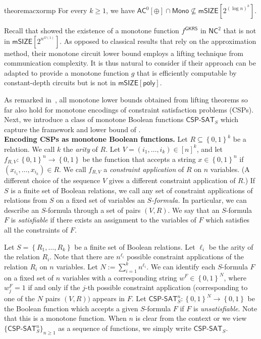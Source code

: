\documentclass[10pt,a4paper]{article}
\newcommand{\poly}{\mathsf{poly}}
\newcommand{\complexityfont}[1]{\mathsf{#1}}
\newcommand{\monclass}[1]{\mathsf{m}#1}
\def\AC           {\complexityfont{AC}}
\def\NC           {\complexityfont{NC}}
\def\SIZE         {\complexityfont{SIZE}}
\def\mSIZE        {\monclass{\SIZE}}
\newcommand{\semMon}[1]{#1 \cap \monfns}
\newcommand{\monfns}{\mathsf{Mono}}
\def\sseq{\subseteq}
\newcommand{\set}[1]{\left\{#1\right\}}
\newcommand{\blt}{\set{0,1}}
\newcommand{\CSPf}[1]{\mathsf{CSP}\text{-}\mathsf{SAT}_{#1}}
\newcommand{\CSPfn}[2]{\CSPf{#1}^{#2}}
\begin{document}
\begin{restatable}{theorem}{acxormp}
    \label{thm:ac02-mp-intro}
    For every $k \geq 1$,
    we have
$\semMon{\AC^0[\oplus]} \not\sseq \mSIZE[2^{(\log n)^k}]$.
\end{restatable}

\label{sec:intro_mon_csp}

Recall that 
\citep{gkrs19} 
showed the existence of a monotone function $f^{\mathsf{GKRS}}$ in $\NC^2$ that is not in $\mSIZE[2^{n^{\Omega(1)}}]$. As opposed to classical results \citep{razborov1985lower, andreev1985method, DBLP:journals/combinatorica/AlonB87, tardos_1988} that rely on the approximation method, their monotone circuit lower bound employs a  lifting technique from communication complexity. It is thus natural to consider if their approach can be adapted to provide a monotone function $g$ that is efficiently computable by constant-depth circuits but is not in $\mSIZE[\poly]$. 

As remarked in~\cite{gkrs19,DBLP:journals/sigact/RezendeGR22}, all
monotone lower bounds 
obtained from lifting theorems so far 
also hold for monotone encodings of constraint satisfaction problems (CSPs). 
Next, we introduce a class of monotone Boolean functions $\CSPf{S}$ which
capture the framework and lower bound of \citep{gkrs19}.\\

\noindent \textbf{Encoding CSPs as monotone Boolean functions.} Let $R \sseq \blt^k$ be a relation.
We call $k$ the \emph{arity} of $R$.
Let
$V = (i_1,\dots,i_k) \in [n]^k$,
and 
let
$f_{R,V}: \blt^n \to \blt$
be
the function 
that
accepts a string $x \in \blt^n$
if $(x_{i_1},\dots,x_{i_k}) \in R$.
We call $f_{R,V}$ a \emph{constraint application} of $R$ on $n$ variables.
(A different choice of the sequence $V$
gives a different constraint application of $R$.)
If $S$ is a finite set of Boolean relations,
we call any set of constraint applications of relations from $S$
on a fixed set of variables
an \emph{$S$-formula.}
In particular, we can describe an $S$-formula through a set of pairs $(V,R)$.
We say that an $S$-formula $F$ is \emph{satisfiable}
if there exists an assignment to the variables of $F$
which satisfies all the constraints of $F$.

Let $S = \set{R_1,\dots,R_k}$ be a finite set of Boolean relations.
Let $\ell_i$ be the arity of the relation $R_i$.
Note that there are $n^{\ell_i}$ possible constraint applications
of the relation $R_i$ on $n$ variables.
Let
$N := \sum_{i=1}^k n^{\ell_i}$.
We can identify each 
$S$-formula $F$
on a fixed set of $n$ variables 
with a corresponding string $w^F \in \blt^N$, where $w^F_j = 1$ if and only if the $j$-th possible constraint application (corresponding to one of the $N$ pairs $(V,R))$ appears in $F$.
Let $\CSPfn{S}{n} : \blt^N \to \blt$
be the Boolean function which accepts a given 
$S$-formula $F$ if $F$ is \emph{unsatisfiable}.
Note that this is a monotone function.
When $n$ is clear from the context or we view $\{\CSPfn{S}{n}\}_{n \geq 1}$ as a sequence of functions, we simply write
$\CSPf{S}$.\\
\end{document}
